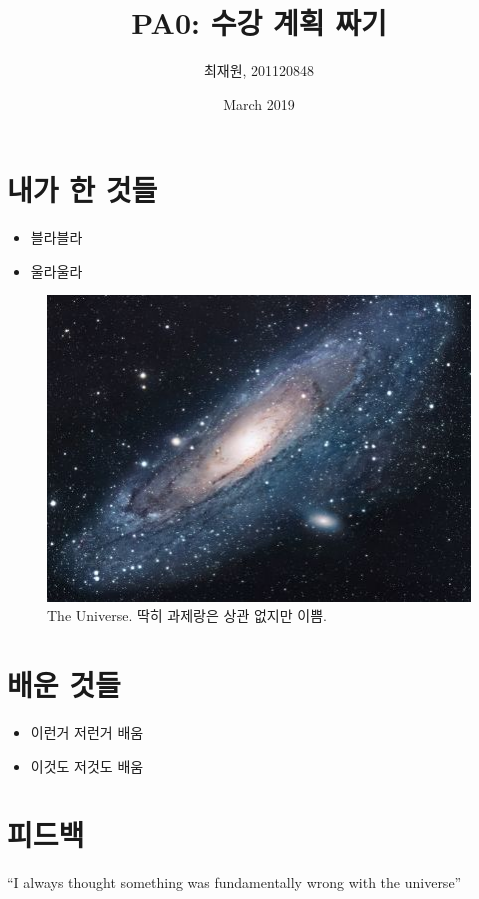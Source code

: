 \documentclass{article}
\title{PA0: 수강 계획 짜기}
\author{최재원, 201120848}
\date{March 2019}
\begin{document}
\maketitle

\section{내가 한 것들}

\begin{itemize}
    \item 블라블라
    \item 울라울라
\end{itemize}

\begin{figure}[h!]
\centering
\includegraphics[scale=1.7]{universe}
\caption{The Universe. 딱히 과제랑은 상관 없지만 이쁨.}
\label{fig:universe}
\end{figure}

\section{배운 것들}

\begin{itemize}
    \item 이런거 저런거 배움
    \item 이것도 저것도 배움
\end{itemize}

\section{피드백}
``I always thought something was fundamentally wrong with the universe'' \citep{adams1995hitchhiker}



\end{document}
